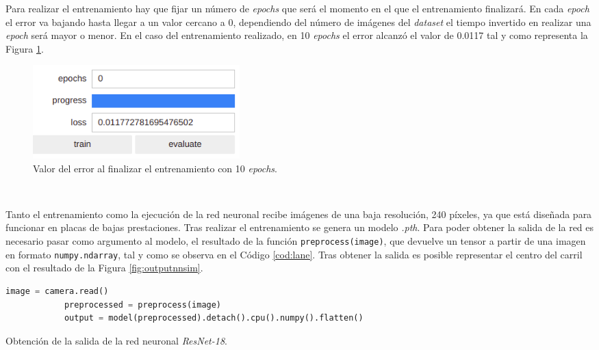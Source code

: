 Para realizar el entrenamiento hay que fijar un número de \textit{epochs} que será el momento en el que el entrenamiento finalizará. En cada \textit{epoch} el error va bajando hasta llegar a un valor cercano a 0, dependiendo del número de imágenes del \textit{dataset} el tiempo invertido en realizar una \textit{epoch} será mayor o menor. En el caso del entrenamiento realizado, en 10 \textit{epochs} el error alcanzó el valor de 0.0117 tal y como representa la Figura \ref{fig:epochsimulator}.\\

\begin{figure} [h!]
	\begin{center}
		\includegraphics[width=8cm]{figs/epochSimulator}
	\end{center}
	\caption{Valor del error al finalizar el entrenamiento con 10 \textit{epochs}.}
	\label{fig:epochsimulator}
\end{figure}\


Tanto el entrenamiento como la ejecución de la red neuronal recibe imágenes de una baja resolución, 240 píxeles, ya que está diseñada para funcionar en placas de bajas prestaciones. Tras realizar el entrenamiento se genera un modelo \textit{.pth}. Para poder obtener la salida de la red es necesario pasar como argumento al modelo, el resultado de la función \verb|preprocess(image)|, que devuelve un tensor a partir de una imagen en formato \verb|numpy.ndarray|, tal y como se observa en el Código \ref{cod:lane}. Tras obtener la salida es posible representar el centro del carril con el resultado de la Figura \ref{fig:outputnnsim}.\\

\begin{code}[h]
	\begin{lstlisting}[language=Python]
			image = camera.read()
    		preprocessed = preprocess(image)
    		output = model(preprocessed).detach().cpu().numpy().flatten()
	\end{lstlisting}
	\caption[Obtención de la salida de la red neuronal \textit{ResNet-18}.]{Obtención de la salida de la red neuronal \textit{ResNet-18}.}
	\label{cod:lane}
\end{code}

